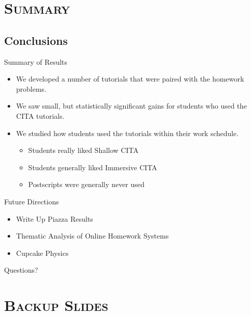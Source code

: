 \documentclass[xcolor=x11names,compress]{beamer}
\begin{document}

\section{\scshape Summary}

\subsection{Conclusions}

\begin{frame}{Summary of Results}
	\begin{itemize}
		\item We developed a number of tutorials that were paired with the homework problems.
		\item We saw small, but statistically significant gains for students who used the CITA tutorials.
		\item We studied how students used the tutorials within their work schedule.
		\begin{itemize}
			\item Students really liked Shallow CITA
			\item Students generally liked Immersive CITA
			\item Postscripts were generally never used
		\end{itemize}
	\end{itemize}
\end{frame}

\begin{frame}{Future Directions}
	\begin{itemize}
		\item Write Up Piazza Results
		\item Thematic Analysis of Online Homework Systems
		\item Cupcake Physics
	\end{itemize}
\end{frame}

\begin{frame}{}
	\begin{center}
		Questions?
	\end{center}
\end{frame}


\appendix
\section{\scshape Backup Slides}
\end{document}
